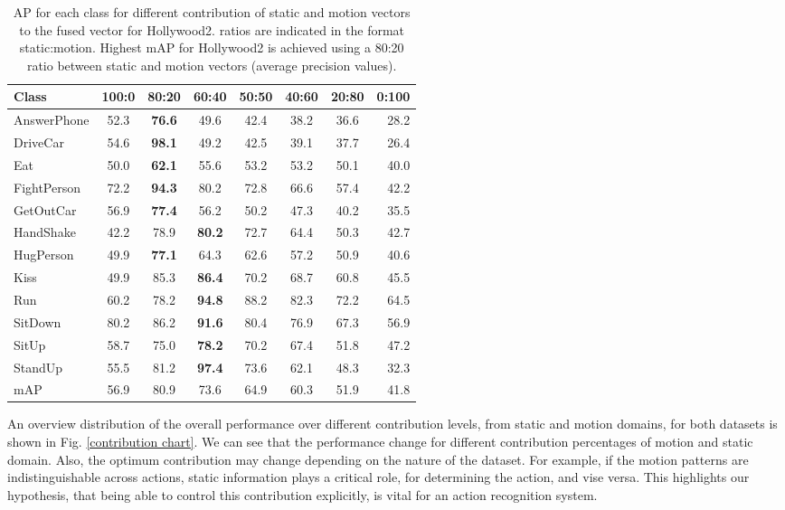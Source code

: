 \begin{table}[]
\centering
\caption{AP for each class for different contribution of static and motion vectors to the fused vector for Hollywood2. ratios are indicated in the
format static:motion. Highest mAP for Hollywood2 is achieved using a
80:20 ratio between static and motion vectors (average precision values).}\label{tbl:rho hollywood2}
\begin{tabular}{@{} l c c c c c c r @{} }
\toprule
Class           & 100:0 & 80:20 & 60:40 & 50:50 & 40:60 & 20:80 & 0:100 \\ \midrule \midrule
AnswerPhone     & 52.3& \textbf{76.6}& 49.6& 42.4& 38.2& 36.6& 28.2        \\
DriveCar        & 54.6& \textbf{98.1}& 49.2& 42.5& 39.1& 37.7& 26.4            \\
Eat             & 50.0& \textbf{62.1}& 55.6& 53.2& 53.2& 50.1& 40.0           \\
FightPerson     & 72.2& \textbf{94.3}& 80.2& 72.8& 66.6& 57.4& 42.2  \\
GetOutCar       & 56.9& \textbf{77.4}& 56.2& 50.2& 47.3& 40.2& 35.5\\
HandShake       & 42.2& 78.9& \textbf{80.2}& 72.7& 64.4& 50.3& 42.7 \\
HugPerson       & 49.9& \textbf{77.1}& 64.3& 62.6& 57.2& 50.9& 40.6 \\
Kiss            & 49.9& 85.3& \textbf{86.4}& 70.2& 68.7& 60.8& 45.5 \\
Run             & 60.2& 78.2& \textbf{94.8}& 88.2& 82.3& 72.2& 64.5  \\
SitDown         & 80.2& 86.2& \textbf{91.6}& 80.4& 76.9& 67.3& 56.9  \\
SitUp           & 58.7& 75.0& \textbf{78.2}& 70.2& 67.4& 51.8& 47.2 \\
StandUp         & 55.5& 81.2& \textbf{97.4}& 73.6& 62.1& 48.3& 32.3 \\ \midrule
mAP             & 56.9& 80.9   &  73.6    &  64.9   &    60.3   &   51.9    &  41.8\\ \bottomrule

\end{tabular}
\end{table}

An overview distribution of the overall performance over different contribution levels, from static and motion domains, for both datasets is shown in Fig. \ref{contribution chart}.
We can see that the performance change for different contribution percentages of motion and static domain. Also, the optimum contribution may change
depending on the nature of the dataset. For example, if the motion patterns are indistinguishable across actions, static information plays
a critical role, for determining the action, and vise versa. This highlights
our hypothesis, that being able to control this contribution explicitly, is vital for an action recognition system.


